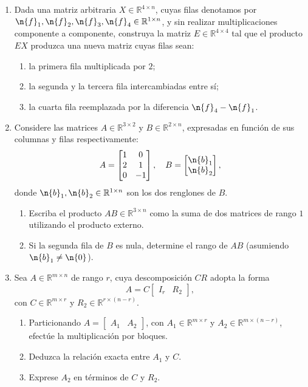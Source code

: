 \begin{enumerate}[leftmargin=*,label=\textbf{1.\arabic*}]
\item Dada una matriz arbitraria $X \in \mathbb{R}^{4 \times n}$, cuyas filas denotamos por $\n{f}_1, \n{f}_2, \n{f}_3, \n{f}_4 \in \mathbb{R}^{1 \times n}$, y sin realizar multiplicaciones componente a componente, construya la matriz $E \in \mathbb{R}^{4 \times 4}$ tal que el producto $EX$ produzca una nueva matriz cuyas filas sean:
\begin{enumerate}[label=\alph*)]
    \item la primera fila multiplicada por $2$;
    \item la segunda y la tercera fila intercambiadas entre sí;
    \item la cuarta fila reemplazada por la diferencia $\n{f}_4 - \n{f}_1$.
\end{enumerate}

\item Considere las matrices $A \in \mathbb{R}^{3 \times 2}$ y $B \in \mathbb{R}^{2 \times n}$, expresadas en función de sus columnas y filas respectivamente:
\[
A = \begin{bmatrix} 1 & 0 \\ 2 & 1 \\ 0 & -1 \end{bmatrix}, \quad
B = \begin{bmatrix} \n{b}_1 \\ \n{b}_2 \end{bmatrix},
\]
donde $\n{b}_1, \n{b}_2 \in \mathbb{R}^{1 \times n}$ son los dos renglones de $B$.
\begin{enumerate}[label=\alph*)]
    \item Escriba el producto $AB \in \mathbb{R}^{3 \times n}$ como la suma de dos matrices de rango $1$ utilizando el producto externo.
    \item Si la segunda fila de $B$ es nula, determine el rango de $AB$ (asumiendo $\n{b}_1 \neq \n{0}$).
\end{enumerate}

\item Sea $A \in \mathbb{R}^{m \times n}$ de rango $r$, cuya descomposición $CR$ adopta la forma
\[
A = C \begin{bmatrix} I_r & R_2 \end{bmatrix},
\]
con $C \in \mathbb{R}^{m \times r}$ y $R_2 \in \mathbb{R}^{r \times (n-r)}$.
\begin{enumerate}[label=\alph*)]
    \item Particionando $A = \begin{bmatrix} A_1 & A_2 \end{bmatrix}$, con $A_1 \in \mathbb{R}^{m \times r}$ y $A_2 \in \mathbb{R}^{m \times (n-r)}$, efectúe la multiplicación por bloques.
    \item Deduzca la relación exacta entre $A_1$ y $C$.
    \item Exprese $A_2$ en términos de $C$ y $R_2$.
\end{enumerate}


\end{enumerate}
